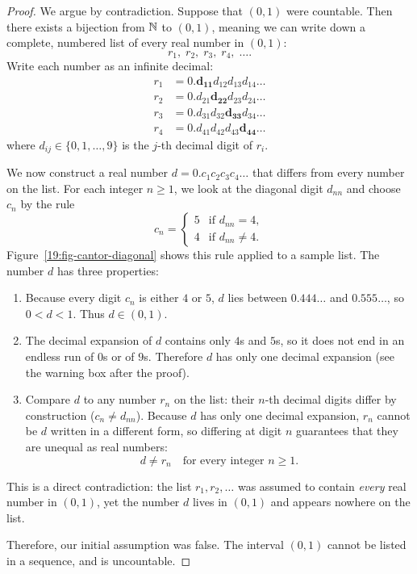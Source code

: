 \begin{proof}
We argue by contradiction. Suppose that $(0, 1)$ were countable. 
Then there exists a bijection from $\mathbb{N}$ to $(0, 1)$, meaning we can write down a complete, numbered list of every real number in $(0, 1)$:
\[
r_1, \; r_2, \; r_3, \; r_4, \; \dots.
\]
Write each number as an infinite decimal:
\begin{align*}
r_1 &= 0.\mathbf{d_{11}} d_{12} d_{13} d_{14} \dots \\
r_2 &= 0.d_{21} \mathbf{d_{22}} d_{23} d_{24} \dots \\
r_3 &= 0.d_{31} d_{32} \mathbf{d_{33}} d_{34} \dots \\
r_4 &= 0.d_{41} d_{42} d_{43} \mathbf{d_{44}} \dots
\end{align*}
where $d_{ij} \in \{0, 1, \dots, 9\}$ is the $j$-th decimal digit of $r_i$.

We now construct a real number $d = 0.c_1 c_2 c_3 c_4 \dots$ that differs from every number on the list. For each integer $n \ge 1$, we look at the diagonal digit $d_{nn}$ and choose $c_n$ by the rule
\[
c_n = \begin{cases} 5 & \text{if } d_{nn} = 4, \\ 4 & \text{if } d_{nn} \neq 4. \end{cases}
\]
Figure~\ref{19:fig-cantor-diagonal} shows this rule applied to a sample list. The number $d$ has three properties:
\begin{enumerate}[label=\arabic*.]
\item Because every digit $c_n$ is either $4$ or $5$, $d$ lies between $0.444\ldots$ and $0.555\ldots$, so $0 < d < 1$. Thus $d \in (0, 1)$.
\item The decimal expansion of $d$ contains only $4$s and $5$s, so it does not end in an endless run of $0$s or of $9$s. Therefore $d$ has only one decimal expansion (see the warning box after the proof).
\item Compare $d$ to any number $r_n$ on the list: their $n$-th decimal digits differ by construction ($c_n \neq d_{nn}$). Because $d$ has only one decimal expansion, $r_n$ cannot be $d$ written in a different form, so differing at digit $n$ guarantees that they are unequal as real numbers:
\[
d \neq r_n \quad \text{for every integer } n \ge 1.
\]
\end{enumerate}

This is a direct contradiction: the list $r_1, r_2, \dots$ was assumed to contain \emph{every} real number in $(0, 1)$, yet the number $d$ lives in $(0, 1)$ and appears nowhere on the list.

Therefore, our initial assumption was false. The interval $(0, 1)$ cannot be listed in a sequence, and is uncountable.
\end{proof}


